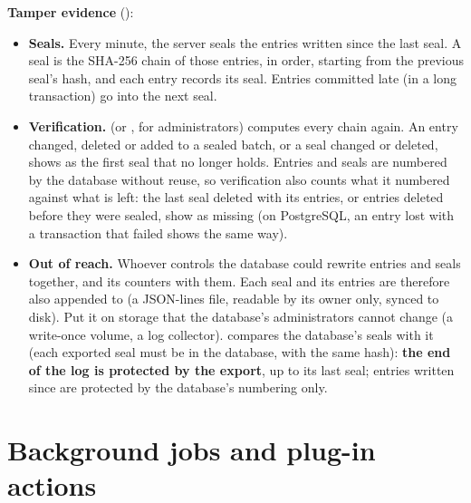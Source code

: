 \textbf{Tamper evidence} ():
\begin{itemize}
\item \textbf{Seals.} Every minute, the server seals the entries written since the last seal. A
  seal is the SHA-256 chain of those entries, in order, starting from the previous seal's hash,
  and each entry records its seal. Entries committed late (in a long transaction) go into the
  next seal.
\item \textbf{Verification.}  (or , for
  administrators) computes every chain again. An entry changed, deleted or added to a sealed
  batch, or a seal changed or deleted, shows as the first seal that no longer holds. Entries and
  seals are numbered by the database without reuse, so verification also counts what it numbered
  against what is left: the last seal deleted with its entries, or entries deleted before they
  were sealed, show as missing (on PostgreSQL, an entry lost with a transaction that failed shows
  the same way).
\item \textbf{Out of reach.} Whoever controls the database could rewrite entries and seals
  together, and its counters with them. Each seal and its entries are therefore also appended to
   (a JSON-lines file, readable by its owner only, synced to disk). Put it on
  storage that the database's administrators cannot change (a write-once volume, a log
  collector).  compares the database's seals with it (each exported seal
  must be in the database, with the same hash): \textbf{the end of the log is protected by the
  export}, up to its last seal; entries written since are protected by the database's numbering
  only.
\end{itemize}

\section{Background jobs and plug-in actions}
\label{sec:security-jobs}

